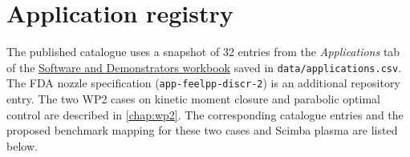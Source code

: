 \def\ApplicationSheetCount{32}
\def\ApplicationSheetLastRow{33}
\section{Application registry}
\label{sec:v3-application-registry}

The published catalogue uses a snapshot of \ApplicationSheetCount{} entries
from the \emph{Applications} tab of the
\href{https://docs.google.com/spreadsheets/d/19v57jpek52nQV2V0tBBON5ivGCz7Bqf3Gw-fHroVHkA/edit?gid=1301884928}{Software and Demonstrators workbook}
saved in \nolinkurl{data/applications.csv}. The FDA nozzle
specification (\nolinkurl{app-feelpp-discr-2}) is an additional
repository entry. The two WP2 cases on kinetic moment closure and
parabolic optimal control are described in \cref{chap:wp2}.
The corresponding catalogue entries and the proposed benchmark mapping
for these two cases and Scimba plasma are listed below.


